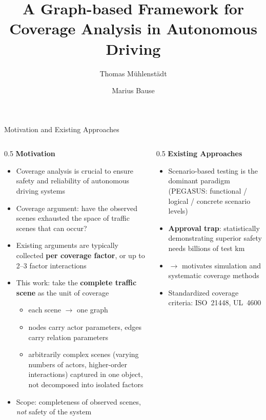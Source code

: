 \documentclass[aspectratio=169]{beamer}
\title{A Graph-based Framework for Coverage Analysis in Autonomous Driving}
\author{Thomas Mühlenstädt \and Marius Bause}
\date{}
\begin{document}
\maketitle

\begin{frame}{Motivation and Existing Approaches}
\begin{columns}[t]
\begin{column}{0.5\textwidth}
\textbf{Motivation}
\begin{itemize}[itemsep=1pt,topsep=1pt,parsep=0pt]
    \scriptsize
    \item Coverage analysis is crucial to ensure safety and reliability of autonomous driving systems
    \item Coverage argument: have the observed scenes exhausted the space of traffic scenes that can occur?
    \item Existing arguments are typically collected \textbf{per coverage factor}, or up to 2--3 factor interactions
    \item This work: take the \textbf{complete traffic scene} as the unit of coverage
    \begin{itemize}[itemsep=1pt,topsep=1pt,parsep=0pt]
        \item each scene $\rightarrow$ one graph
        \item nodes carry actor parameters, edges carry relation parameters
        \item arbitrarily complex scenes (varying numbers of actors, higher-order interactions) captured in one object, not decomposed into isolated factors
    \end{itemize}
    \item Scope: completeness of observed scenes, \emph{not} safety of the system
\end{itemize}
\end{column}
\begin{column}{0.5\textwidth}
\textbf{Existing Approaches}
\begin{itemize}[itemsep=1pt,topsep=1pt,parsep=0pt]
    \scriptsize
    \item Scenario-based testing is the dominant paradigm (PEGASUS: functional / logical / concrete scenario levels)
    \item \textbf{Approval trap}: statistically demonstrating superior safety needs billions of test km
    \item $\rightarrow$ motivates simulation and systematic coverage methods
    \item Standardized coverage criteria: ISO~21448, UL~4600

\end{itemize}
\end{column}
\end{columns}
\end{frame}
\end{document}
